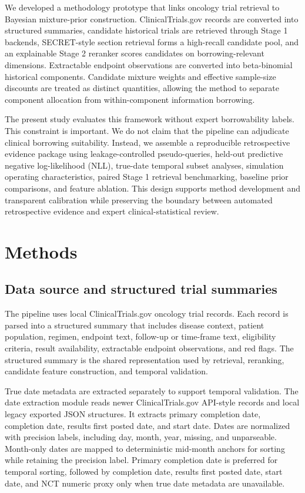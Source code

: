 \documentclass[11pt]{article}
\begin{document}
We developed a methodology prototype that links oncology trial retrieval to Bayesian mixture-prior construction. ClinicalTrials.gov records are converted into structured summaries, candidate historical trials are retrieved through Stage 1 backends, SECRET-style section retrieval forms a high-recall candidate pool, and an explainable Stage 2 reranker scores candidates on borrowing-relevant dimensions. Extractable endpoint observations are converted into beta-binomial historical components. Candidate mixture weights and effective sample-size discounts are treated as distinct quantities, allowing the method to separate component allocation from within-component information borrowing.

The present study evaluates this framework without expert borrowability labels. This constraint is important. We do not claim that the pipeline can adjudicate clinical borrowing suitability. Instead, we assemble a reproducible retrospective evidence package using leakage-controlled pseudo-queries, held-out predictive negative log-likelihood (NLL), true-date temporal subset analyses, simulation operating characteristics, paired Stage 1 retrieval benchmarking, baseline prior comparisons, and feature ablation. This design supports method development and transparent calibration while preserving the boundary between automated retrospective evidence and expert clinical-statistical review.

\section{Methods}

\subsection{Data source and structured trial summaries}

The pipeline uses local ClinicalTrials.gov oncology trial records. Each record is parsed into a structured summary that includes disease context, patient population, regimen, endpoint text, follow-up or time-frame text, eligibility criteria, result availability, extractable endpoint observations, and red flags. The structured summary is the shared representation used by retrieval, reranking, candidate feature construction, and temporal validation.

True date metadata are extracted separately to support temporal validation. The date extraction module reads newer ClinicalTrials.gov API-style records and local legacy exported JSON structures. It extracts primary completion date, completion date, results first posted date, and start date. Dates are normalized with precision labels, including day, month, year, missing, and unparseable. Month-only dates are mapped to deterministic mid-month anchors for sorting while retaining the precision label. Primary completion date is preferred for temporal sorting, followed by completion date, results first posted date, start date, and NCT numeric proxy only when true date metadata are unavailable.
\end{document}
